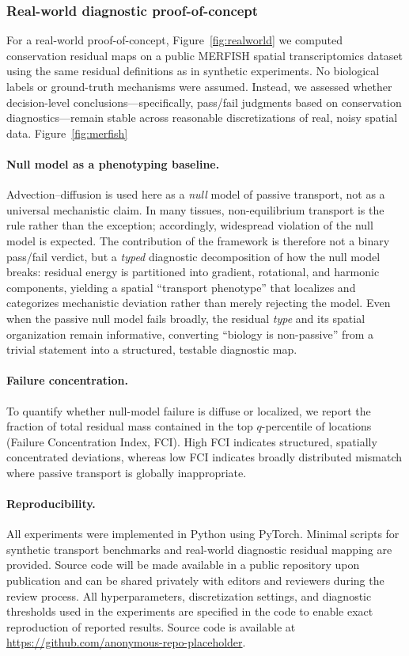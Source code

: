 \documentclass[10pt,article]{article}
\begin{document}
\subsubsection{Real-world diagnostic proof-of-concept}

For a real-world proof-of-concept, Figure~\ref{fig:realworld} we computed conservation residual maps on a public MERFISH spatial transcriptomics dataset using the same residual definitions as in synthetic experiments. No biological labels or ground-truth mechanisms were assumed. Instead, we assessed whether decision-level conclusions—specifically, pass/fail judgments based on conservation diagnostics—remain stable across reasonable discretizations of real, noisy spatial data. Figure~\ref{fig:merfish}

\paragraph{Null model as a phenotyping baseline.}
Advection--diffusion is used here as a \emph{null} model of passive transport, not as a universal mechanistic claim. In many tissues, non-equilibrium transport is the rule rather than the exception; accordingly, widespread violation of the null model is expected. The contribution of the framework is therefore not a binary pass/fail verdict, but a \emph{typed} diagnostic decomposition of how the null model breaks: residual energy is partitioned into gradient, rotational, and harmonic components, yielding a spatial ``transport phenotype'' that localizes and categorizes mechanistic deviation rather than merely rejecting the model.
Even when the passive null model fails broadly, the residual \emph{type} and its spatial organization remain informative, converting ``biology is non-passive'' from a trivial statement into a structured, testable diagnostic map.

\paragraph{Failure concentration.}
To quantify whether null-model failure is diffuse or localized, we report the fraction of total residual mass contained in the top $q$-percentile of locations (Failure Concentration Index, FCI). High FCI indicates structured, spatially concentrated deviations, whereas low FCI indicates broadly distributed mismatch where passive transport is globally inappropriate.

\paragraph{Reproducibility.}
All experiments were implemented in Python using PyTorch. Minimal scripts for synthetic transport benchmarks and real-world diagnostic residual mapping are provided. Source code will be made available in a public repository upon publication and can be shared privately with editors and reviewers during the review process. All hyperparameters, discretization settings, and diagnostic thresholds used in the experiments are specified in the code to enable exact reproduction of reported results.
Source code is available at \url{https://github.com/anonymous-repo-placeholder}.
\end{document}
